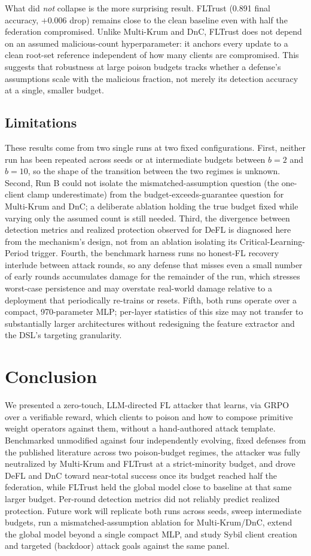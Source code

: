 \documentclass[conference,9pt]{IEEEtran}
\begin{document}
What did \emph{not} collapse is the more surprising result. FLTrust (0.891 final accuracy, $+0.006$ drop) remains close to the clean baseline even with half the federation compromised. Unlike Multi-Krum and DnC, FLTrust does not depend on an assumed malicious-count hyperparameter: it anchors every update to a clean root-set reference independent of how many clients are compromised. This suggests that robustness at large poison budgets tracks whether a defense's assumptions scale with the malicious fraction, not merely its detection accuracy at a single, smaller budget.

\subsection{Limitations}
\label{sec:limitations}
These results come from two single runs at two fixed configurations. First, neither run has been repeated across seeds or at intermediate budgets between $b{=}2$ and $b{=}10$, so the shape of the transition between the two regimes is unknown. Second, Run B could not isolate the mismatched-assumption question (the one-client clamp underestimate) from the budget-exceeds-guarantee question for Multi-Krum and DnC; a deliberate ablation holding the true budget fixed while varying only the assumed count is still needed. Third, the divergence between detection metrics and realized protection observed for DeFL is diagnosed here from the mechanism's design, not from an ablation isolating its Critical-Learning-Period trigger. Fourth, the benchmark harness runs no honest-FL recovery interlude between attack rounds, so any defense that misses even a small number of early rounds accumulates damage for the remainder of the run, which stresses worst-case persistence and may overstate real-world damage relative to a deployment that periodically re-trains or resets. Fifth, both runs operate over a compact, 970-parameter MLP; per-layer statistics of this size may not transfer to substantially larger architectures without redesigning the feature extractor and the DSL's targeting granularity.

\section{Conclusion}
\label{sec:conclusion}
We presented a zero-touch, LLM-directed FL attacker that learns, via GRPO over a verifiable reward, which clients to poison and how to compose primitive weight operators against them, without a hand-authored attack template. Benchmarked unmodified against four independently evolving, fixed defenses from the published literature across two poison-budget regimes, the attacker was fully neutralized by Multi-Krum and FLTrust at a strict-minority budget, and drove DeFL and DnC toward near-total success once its budget reached half the federation, while FLTrust held the global model close to baseline at that same larger budget. Per-round detection metrics did not reliably predict realized protection. Future work will replicate both runs across seeds, sweep intermediate budgets, run a mismatched-assumption ablation for Multi-Krum/DnC, extend the global model beyond a single compact MLP, and study Sybil client creation and targeted (backdoor) attack goals against the same panel.
\end{document}

